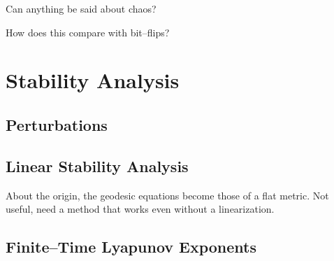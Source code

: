 Can anything be said about chaos?

How does this compare with bit--flips?



\section{Stability Analysis}

\subsection{Perturbations}

\subsection{Linear Stability Analysis}

About the origin, the geodesic equations become those of a flat metric.
Not useful, need a method that works even without a linearization.


\subsection{Finite--Time Lyapunov Exponents}

